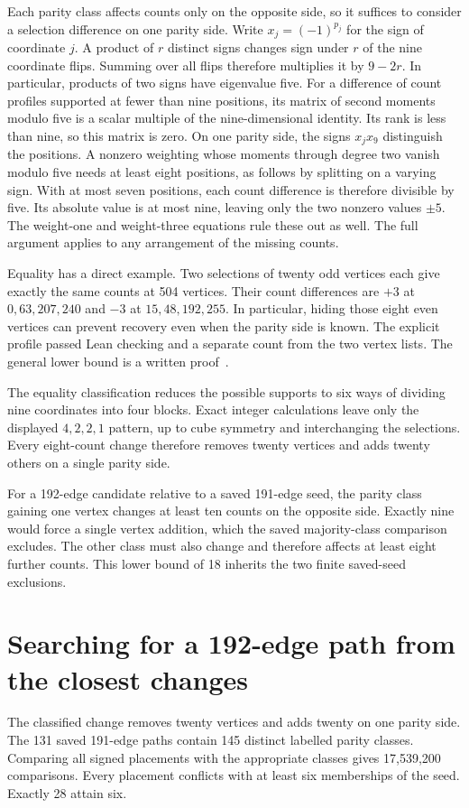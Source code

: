 \documentclass[11pt,a4paper]{article}
\begin{document}
Each parity class affects counts only on the opposite side, so it
suffices to consider a selection difference on one parity side.
Write $x_j=(-1)^{p_j}$ for the sign of coordinate $j$. A product of
$r$ distinct signs changes sign under $r$ of the nine coordinate
flips. Summing over all flips therefore multiplies it by $9-2r$.
In particular, products of two signs have eigenvalue five.
For a difference of count profiles supported at
fewer than nine positions, its matrix of second moments modulo five
is a scalar multiple of the nine-dimensional identity. Its rank is
less than nine, so this matrix is zero. On one parity side, the signs
$x_jx_9$ distinguish the positions. A nonzero weighting whose moments
through degree two vanish modulo five needs at least eight positions,
as follows by splitting on a varying sign. With at most seven positions,
each count difference is therefore divisible by five. Its absolute
value is at most nine, leaving only the two nonzero values $\pm5$.
The weight-one and weight-three equations rule these out as well.
The full argument applies to any arrangement of the missing counts.

Equality has a direct example. Two selections of twenty odd vertices
each give exactly the same counts at 504 vertices. Their count
differences are $+3$ at $0,63,207,240$ and $-3$ at $15,48,192,255$.
In particular, hiding those eight even vertices can prevent recovery
even when the parity side is known. The explicit profile passed Lean
checking and a separate count from the two vertex lists. The general
lower bound is a written proof~\cite{research241}.

The equality classification reduces the possible supports to six ways
of dividing nine coordinates into four blocks. Exact integer calculations
leave only the displayed $4,2,2,1$ pattern, up to cube symmetry and
interchanging the selections. Every eight-count change therefore
removes twenty vertices and adds twenty others on a single parity side.

For a 192-edge candidate relative to a saved 191-edge seed, the parity
class gaining one vertex changes at least ten counts on the opposite
side. Exactly nine would force a single vertex addition, which the
saved majority-class comparison excludes. The other class must also
change and therefore affects at least eight further counts. This
lower bound of 18 inherits the two finite saved-seed exclusions.

\section{Searching for a 192-edge path from the closest changes}
The classified change removes twenty vertices and adds twenty on one
parity side. The 131 saved 191-edge paths contain 145 distinct labelled
parity classes. Comparing all signed placements with the appropriate
classes gives 17,539,200 comparisons. Every placement conflicts with
at least six memberships of the seed. Exactly 28 attain six.
\end{document}
